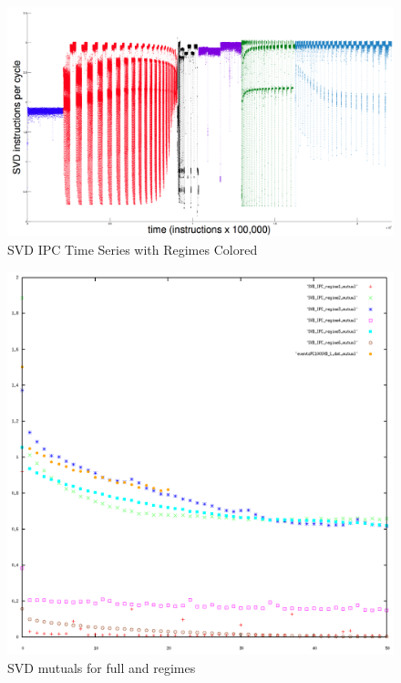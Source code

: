\documentclass{article}
\begin{document}
\begin{figure}[htbp]
\begin{center}
\includegraphics[width=\textwidth]{figs/SVD1RegimesColored}\caption{SVD IPC Time Series with Regimes Colored}
\label{default}
\end{center}
\end{figure}



\begin{figure}[htbp]
\begin{center}
\includegraphics[width=\textwidth]{figs/svd_mutuals}\caption{SVD mutuals for full and regimes}
\label{default}
\end{center}
\end{figure}
\end{document}
